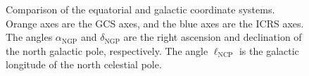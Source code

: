 \documentclass[a4paper, 10pt]{report}
\begin{document}
\begin{figure}
\begin{tikzpicture}[tdplot_main_coords,scale=1.5]
\end{tikzpicture}
\caption{Comparison of the equatorial and galactic coordinate systems. \textcolor{stp-orange}{Orange} axes are the GCS axes, and the \textcolor{stp-blue}{blue} axes are the ICRS axes. The angles $\alpha_\text{NGP}$ and $\delta_\text{NGP}$ are the right ascension and declination of the north galactic pole, respectively. The angle $\ell_\text{NCP}$ is the galactic longitude of the north celestial pole.}
\label{fig:galtrans}
\end{figure}
\end{document}
